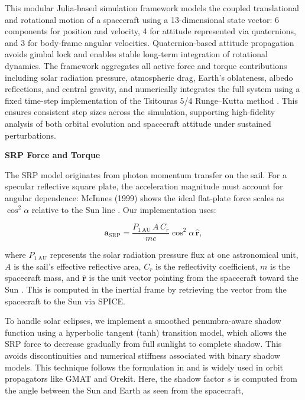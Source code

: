 \documentclass[final,3p,times,twocolumn]{elsarticle}
\begin{document}
\vspace{5pt}
\par\noindent This modular Julia-based simulation framework models the coupled translational and rotational motion of a spacecraft using a 13-dimensional state vector: 6 components for position and velocity, 4 for attitude represented via quaternions, and 3 for body-frame angular velocities. Quaternion-based attitude propagation avoids gimbal lock and enables stable long-term integration of rotational dynamics. The framework aggregates all active force and torque contributions including solar radiation pressure, atmospheric drag, Earth's oblateness, albedo reflections, and central gravity, and numerically integrates the full system using a fixed time-step implementation of the Tsitouras 5/4 Runge–Kutta method \citep{tsitouras2011}. This ensures consistent step sizes across the simulation, supporting high-fidelity analysis of both orbital evolution and spacecraft attitude under sustained perturbations.
\vspace{7pt}

\noindent\textbf{SRP Force and Torque} \vspace{2pt}

\par\noindent The SRP model originates from photon momentum transfer on the sail. For a specular reflective square plate, the acceleration magnitude must account for angular dependence: McInnes (1999) shows the ideal flat-plate force scales as \( \cos^2{\alpha} \) relative to the Sun line \citep{mcinnes1999}. Our implementation uses:

\begin{equation}
    \mathbf{a}_{\text{SRP}} = \frac{P_{1\ \text{AU}} \, A \, C_r}{m c} \cos^2{\alpha} \, \hat{\mathbf{r}},
    \label{eq:srp_force}
\end{equation}

\par \noindent where $P_{1\ \text{AU}}$ represents the solar radiation pressure flux at one astronomical unit, $A$ is the sail’s effective reflective area, $C_r$ is the reflectivity coefficient, $m$ is the spacecraft mass, and $\hat{\mathbf{r}}$ is the unit vector pointing from the spacecraft toward the Sun \citep{torque_models}. This is computed in the inertial frame by retrieving the vector from the spacecraft to the Sun via SPICE. 
\vspace{5pt}
\par\noindent To handle solar eclipses, we implement a smoothed penumbra-aware shadow function using a hyperbolic tangent (tanh) transition model, which allows the SRP force to decrease gradually from full sunlight to complete shadow. This avoids discontinuities and numerical stiffness associated with binary shadow models. This technique follows the formulation in \cite{shadow} and is widely used in orbit propagators like GMAT and Orekit. Here, the shadow factor \( s \) is computed from the angle between the Sun and Earth as seen from the spacecraft,
\end{document}
